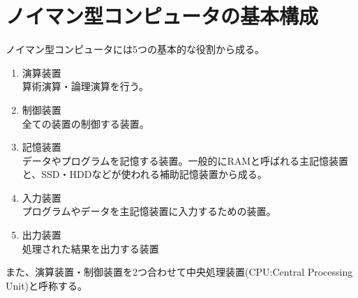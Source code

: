 \documentclass[a4j,uplatex]{jsarticle}
\numberwithin{equation}{section}
\begin{document}
	\section{ノイマン型コンピュータの基本構成}
		ノイマン型コンピュータには5つの基本的な役割から成る。
		\begin{enumerate}
			\item 演算装置 \mbox{}\\
				算術演算・論理演算を行う。
			\item 制御装置 \mbox{}\\
				全ての装置の制御する装置。
			\item 記憶装置 \mbox{}\\
				データやプログラムを記憶する装置。一般的にRAMと呼ばれる主記憶装置と、SSD・HDDなどが使われる補助記憶装置から成る。
			\item 入力装置 \mbox{}\\
				プログラムやデータを主記憶装置に入力するための装置。
			\item 出力装置 \mbox{}\\
				処理された結果を出力する装置
		\end{enumerate}
		また、演算装置・制御装置を2つ合わせて中央処理装置(CPU:Central Processing Unit)と呼称する。
\end{document}
